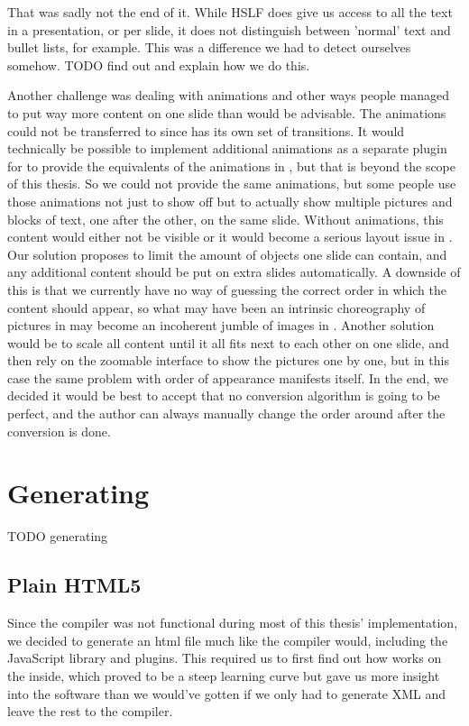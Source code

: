    That was sadly not the end of it. While HSLF does give us access to all the
   text in a presentation, or per slide, it does not distinguish between
   'normal' text and bullet lists, for example. This was a difference we had to
   detect ourselves somehow. TODO find out and explain how we do this.

   Another challenge was dealing with animations and other ways people managed
   to put way more content on one slide than would be advisable. The animations
   could not be transferred to \mxp since \mxp has its own set of transitions.
   It would technically be possible to implement additional animations as a
   separate plugin for \mxp to provide the equivalents of the animations in
   \ppt*, but that is beyond the scope of this thesis. So we could not provide
   the same animations, but some people use those animations not just to show
   off but to actually show multiple pictures and blocks of text, one after the
   other, on the same slide. Without animations, this content would either not
   be visible or it would become a serious layout issue in \mxp. Our solution
   proposes to limit the amount of objects one slide can contain, and any
   additional content should be put on extra slides automatically. A downside
   of this is that we currently have no way of guessing the correct order in
   which the content should appear, so what may have been an intrinsic
   choreography of pictures in \ppt may become an incoherent jumble of images
   in \mxp. Another solution would be to scale all content until it all fits
   next to each other on one slide, and then rely on the zoomable interface to
   show the pictures one by one, but in this case the same problem with order
   of appearance manifests itself. In the end, we decided it would be best to
   accept that no conversion algorithm is going to be perfect, and the author
   can always manually change the order around after the conversion is done.

  \section{Generating \mxp}

   TODO generating

   \subsection{Plain HTML5}

    Since the \mxp compiler was not functional during most of this thesis'
    implementation, we decided to generate an html file much like the \mxp
    compiler would, including the \mxp JavaScript library and plugins. This
    required us to first find out how \mxp works on the inside, which proved to
    be a steep learning curve but gave us more insight into the software than
    we would've gotten if we only had to generate \mxp XML and leave the rest
    to the compiler.

